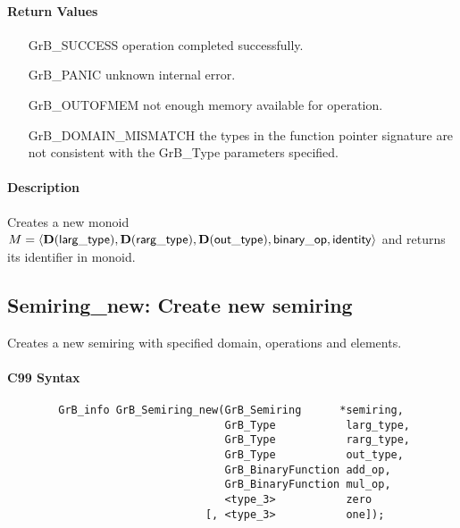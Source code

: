\paragraph{Return Values}

\begin{itemize}[leftmargin=2.1in]
\item[{\sf GrB\_SUCCESS}]           operation completed successfully.
\item[{\sf GrB\_PANIC}]             unknown internal error.
\item[{\sf GrB\_OUTOFMEM}]          not enough memory available for operation.
\item[{\sf GrB\_DOMAIN\_MISMATCH}]  the types in the function pointer signature are not   
                                    consistent with the {\sf GrB\_Type} parameters specified.
\end{itemize}

\paragraph{Description}

Creates a new monoid $M = \langle \bold{D}({\sf larg\_type}), \bold{D}({\sf rarg\_type}), 
\bold{D}({\sf out\_type}), {\sf binary\_op}, {\sf identity} \rangle$ and
returns its identifier in {\sf monoid}.


\subsection{{\sf Semiring\_new}: Create new semiring}

Creates a new semiring with specified domain, operations and elements.

\paragraph{C99 Syntax}

\begin{verbatim}
        GrB_info GrB_Semiring_new(GrB_Semiring      *semiring,
                                  GrB_Type           larg_type,
                                  GrB_Type           rarg_type,
                                  GrB_Type           out_type,
                                  GrB_BinaryFunction add_op,
                                  GrB_BinaryFunction mul_op,
                                  <type_3>           zero
                               [, <type_3>           one]);
\end{verbatim}

